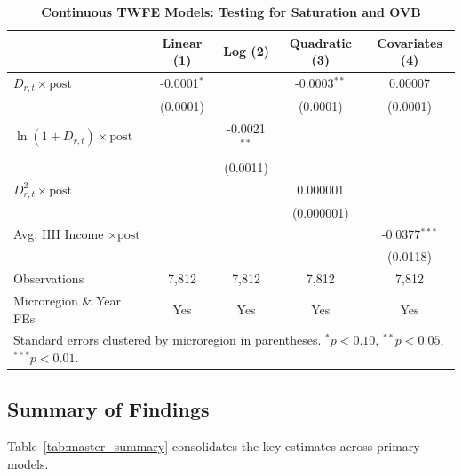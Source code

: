 \begin{table}[ht]
\centering
\caption{\textbf{Continuous TWFE Models: Testing for Saturation and OVB}}
\label{tab:continuous_twfe}
\begin{tabular}{lcccc}
\hline
 & \textbf{Linear (1)} & \textbf{Log (2)} & \textbf{Quadratic (3)} & \textbf{Covariates (4)} \\
\hline
$D_{r,t} \times \text{post}$ & -0.0001$^{*}$ &  & -0.0003$^{**}$ & 0.00007 \\
 & (0.0001) &  & (0.0001) & (0.0001) \\
$\ln(1 + D_{r,t}) \times \text{post}$ &  & -0.0021$^{**}$ &  &  \\
 &  & (0.0011) &  &  \\
$D_{r,t}^2 \times \text{post}$ &  &  & 0.000001 &  \\
 &  &  & (0.000001) &  \\
Avg. HH Income $\times \text{post}$ &  &  &  & -0.0377$^{***}$ \\
 &  &  &  & (0.0118) \\
\hline
Observations & 7,812 & 7,812 & 7,812 & 7,812 \\
Microregion \& Year FEs & Yes & Yes & Yes & Yes \\
\hline
\multicolumn{5}{l}{\small Standard errors clustered by microregion in parentheses. $^{*} p<0.10$, $^{**} p<0.05$, $^{***} p<0.01$.}
\end{tabular}
\end{table}

\subsection{Summary of Findings}

Table~\ref{tab:master_summary} consolidates the key estimates across primary models.

